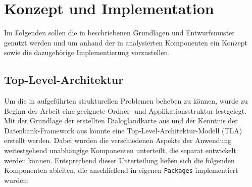 \chapter{Konzept und Implementation}\label{ch:konzept}

Im Folgenden sollen die in  beschriebenen Grundlagen und Entwurfsmuster genutzt werden und um anhand der in  analysierten Komponenten ein Konzept sowie die dazugehörige Implementierung vorzustellen.

\section{Top-Level-Architektur}\label{sec:tla}

Um die in  aufgeführten strukturellen Problemen beheben zu können, wurde zu Beginn der Arbeit eine geeignete Ordner- und Applikationsstruktur festgelegt. Mit der Grundlage der erstellten Dialoglandkarte aus  und der Kenntnis der Datenbank-Framework aus  konnte eine Top-Level-Architektur-Modell (TLA) erstellt werden. Dabei wurden die verschiedenen Aspekte der Anwendung weitestgehend unabhängige Komponenten unterteilt, die separat entwickelt werden können. Entsprechend dieser Unterteilung ließen sich die folgenden Komponenten ableiten, die anschließend in eigenen \texttt{Packages} implementiert wurden:


